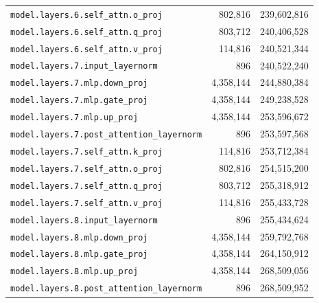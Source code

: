 \documentclass[10pt,a4paper]{article}
\theoremstyle{definition}
\begin{document}
\begin{appendices}
\begin{longtable}{p{9.5cm}rr}
\texttt{model.\allowbreak{}layers.\allowbreak{}6.\allowbreak{}self\_attn.\allowbreak{}o\_proj} & 802,816 & 239,602,816 \\
\texttt{model.\allowbreak{}layers.\allowbreak{}6.\allowbreak{}self\_attn.\allowbreak{}q\_proj} & 803,712 & 240,406,528 \\
\texttt{model.\allowbreak{}layers.\allowbreak{}6.\allowbreak{}self\_attn.\allowbreak{}v\_proj} & 114,816 & 240,521,344 \\
\texttt{model.\allowbreak{}layers.\allowbreak{}7.\allowbreak{}input\_layernorm} & 896 & 240,522,240 \\
\texttt{model.\allowbreak{}layers.\allowbreak{}7.\allowbreak{}mlp.\allowbreak{}down\_proj} & 4,358,144 & 244,880,384 \\
\texttt{model.\allowbreak{}layers.\allowbreak{}7.\allowbreak{}mlp.\allowbreak{}gate\_proj} & 4,358,144 & 249,238,528 \\
\texttt{model.\allowbreak{}layers.\allowbreak{}7.\allowbreak{}mlp.\allowbreak{}up\_proj} & 4,358,144 & 253,596,672 \\
\texttt{model.\allowbreak{}layers.\allowbreak{}7.\allowbreak{}post\_attention\_layernorm} & 896 & 253,597,568 \\
\texttt{model.\allowbreak{}layers.\allowbreak{}7.\allowbreak{}self\_attn.\allowbreak{}k\_proj} & 114,816 & 253,712,384 \\
\texttt{model.\allowbreak{}layers.\allowbreak{}7.\allowbreak{}self\_attn.\allowbreak{}o\_proj} & 802,816 & 254,515,200 \\
\texttt{model.\allowbreak{}layers.\allowbreak{}7.\allowbreak{}self\_attn.\allowbreak{}q\_proj} & 803,712 & 255,318,912 \\
\texttt{model.\allowbreak{}layers.\allowbreak{}7.\allowbreak{}self\_attn.\allowbreak{}v\_proj} & 114,816 & 255,433,728 \\
\texttt{model.\allowbreak{}layers.\allowbreak{}8.\allowbreak{}input\_layernorm} & 896 & 255,434,624 \\
\texttt{model.\allowbreak{}layers.\allowbreak{}8.\allowbreak{}mlp.\allowbreak{}down\_proj} & 4,358,144 & 259,792,768 \\
\texttt{model.\allowbreak{}layers.\allowbreak{}8.\allowbreak{}mlp.\allowbreak{}gate\_proj} & 4,358,144 & 264,150,912 \\
\texttt{model.\allowbreak{}layers.\allowbreak{}8.\allowbreak{}mlp.\allowbreak{}up\_proj} & 4,358,144 & 268,509,056 \\
\texttt{model.\allowbreak{}layers.\allowbreak{}8.\allowbreak{}post\_attention\_layernorm} & 896 & 268,509,952 \\

\end{longtable}
\end{appendices}
\end{document}
